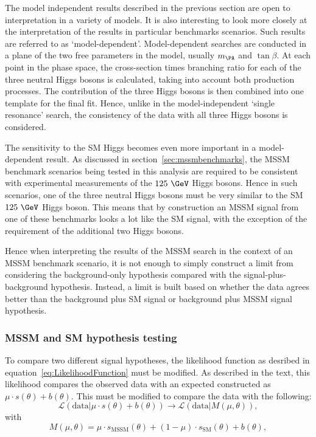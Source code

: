 The model independent results described in the previous section are open to
interpretation in a variety of models. It is also interesting to look more
closely at the interpretation of the results in particular benchmarks scenarios.
Such results are referred to as `model-dependent'. Model-dependent searches are
conducted in a plane of the two free parameters in the model, usually $m_{\PA}$
and $\tan\beta$. At each point in the phase space, the cross-section times
branching ratio for each of the three neutral Higgs bosons is calculated, taking
into account both production processes. The contribution of the three Higgs
bosons is then combined into one template for the final fit. Hence, unlike in the
model-independent `single resonance' search, the consistency of the data with
all three Higgs bosons is considered. 

The sensitivity to the \ac{SM} Higgs becomes even more important in a
model-dependent result. As discussed in
section~\ref{sec:mssmbenchmarks}, the \ac{MSSM} benchmark scenarios being tested in this
analysis are required to be consistent with experimental measurements of the
$125~\GeV$ Higgs bosons. Hence in such scenarios, one of the three neutral Higgs
bosons must be very similar to the \ac{SM} $125~\GeV$ Higgs boson. This means
that by construction an \ac{MSSM} signal from one of these benchmarks looks a
lot like the \ac{SM} signal, with the exception of the requirement of the
additional two Higgs bosons.

Hence when interpreting the results of the \ac{MSSM} search in the context of an
\ac{MSSM} benchmark scenario, it is not enough to simply construct a limit from
considering the background-only hypothesis compared with the
signal-plus-background hypothesis. Instead, a limit is built based on
whether the data agrees better than the background plus \ac{SM} signal or
background plus \ac{MSSM} signal hypothesis.

\subsubsection{\ac{MSSM} and \ac{SM} hypothesis testing}

To compare two different signal hypotheses, the likelihood function as desribed
in equation~\ref{eq:LikelihoodFunction} must be modified. As described in the
text, this likelihood compares the observed data with an expected constructed as
$\mu \cdot s(\theta) + b(\theta)$. This must be modified to compare the data with the
following:
\begin{equation}
\mathcal{L}(\text{data} | \mu \cdot s(\theta) + b(\theta)) \rightarrow
\mathcal{L}(\text{data} | M(\mu,\theta)),
\end{equation}
with
\begin{equation}
M(\mu,\theta) = \mu \cdot s_{\text{MSSM}}(\theta) + (1-\mu) \cdot
s_{\text{SM}}(\theta) + b(\theta), 
\end{equation}

